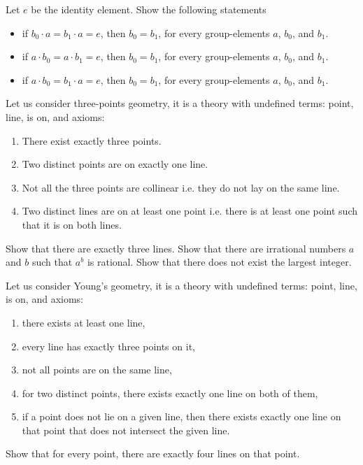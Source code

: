 \begin{chapterendexercises}
    Let $e$ be the identity element. Show the following statements
    \begin{itemize}
      \item if $b_0 \cdot a = b_1 \cdot a = e$, then $b_0 = b_1$, for every
        group-elements $a$, $b_0$, and $b_1$.
      \item if $a \cdot b_0 = a \cdot b_1 = e$, then $b_0 = b_1$, for every
        group-elements $a$, $b_0$, and $b_1$.
      \item if $a \cdot b_0 = b_1 \cdot a = e$, then $b_0 = b_1$, for every
        group-elements $a$, $b_0$, and $b_1$.
    \end{itemize}
  \exercise Let us consider three-points geometry, it is a theory with
    undefined terms: point, line, is on, and axioms:
    \begin{enumerate}
        \item There exist exactly three points.
        \item Two distinct points are on exactly one line.
        \item Not all the three points are collinear i.e. they do not lay on the
            same line.
        \item Two distinct lines are on at least one point i.e. there is at
          least one point such that it is on both lines.
    \end{enumerate}

    Show that there are exactly three lines.
  \exercise Show that there are irrational numbers $a$ and $b$ such that
    $a^b$ is rational.
  \exercise[recommended] Show that there does not exist the largest integer.

  \exercise Let us consider Young's geometry, it is a theory with undefined
    terms: point, line, is on, and axioms:
    \begin{enumerate}
        \item there exists at least one line,
        \item every line has exactly three points on it,
        \item not all points are on the same line,
        \item for two distinct points, there exists exactly one line on both of
          them,
        \item if a point does not lie on a given line, then there exists exactly
          one line on that point that does not intersect the given line.
    \end{enumerate}

    Show that for every point, there are exactly four lines on that point.

\end{chapterendexercises}

